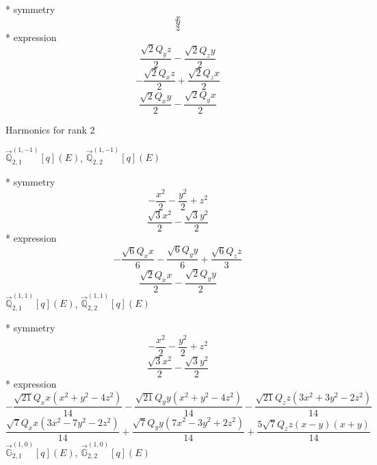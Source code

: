 \documentclass[fleqn,8pt]{jsarticle}
\begin{document}
\noindent\quad ** symmetry
\begin{dmath*}
x
\end{dmath*}
\begin{dmath*}
y
\end{dmath*}
\begin{dmath*}
z
\end{dmath*}
\noindent\quad ** expression
\begin{dmath*}
\frac{\sqrt{2} Q_{y} z}{2} - \frac{\sqrt{2} Q_{z} y}{2}
\end{dmath*}
\begin{dmath*}
- \frac{\sqrt{2} Q_{x} z}{2} + \frac{\sqrt{2} Q_{z} x}{2}
\end{dmath*}
\begin{dmath*}
\frac{\sqrt{2} Q_{x} y}{2} - \frac{\sqrt{2} Q_{y} x}{2}
\end{dmath*}

\noindent * Harmonics for rank 2

\noindent\quad $\vec{\mathbb{Q}}_{2,1}^{(1,-1)}[q](E)$, $\vec{\mathbb{Q}}_{2,2}^{(1,-1)}[q](E)$

\noindent\quad ** symmetry
\begin{dmath*}
- \frac{x^{2}}{2} - \frac{y^{2}}{2} + z^{2}
\end{dmath*}
\begin{dmath*}
\frac{\sqrt{3} x^{2}}{2} - \frac{\sqrt{3} y^{2}}{2}
\end{dmath*}
\noindent\quad ** expression
\begin{dmath*}
- \frac{\sqrt{6} Q_{x} x}{6} - \frac{\sqrt{6} Q_{y} y}{6} + \frac{\sqrt{6} Q_{z} z}{3}
\end{dmath*}
\begin{dmath*}
\frac{\sqrt{2} Q_{x} x}{2} - \frac{\sqrt{2} Q_{y} y}{2}
\end{dmath*}
\noindent\quad $\vec{\mathbb{Q}}_{2,1}^{(1,1)}[q](E)$, $\vec{\mathbb{Q}}_{2,2}^{(1,1)}[q](E)$

\noindent\quad ** symmetry
\begin{dmath*}
- \frac{x^{2}}{2} - \frac{y^{2}}{2} + z^{2}
\end{dmath*}
\begin{dmath*}
\frac{\sqrt{3} x^{2}}{2} - \frac{\sqrt{3} y^{2}}{2}
\end{dmath*}
\noindent\quad ** expression
\begin{dmath*}
- \frac{\sqrt{21} Q_{x} x \left(x^{2} + y^{2} - 4 z^{2}\right)}{14} - \frac{\sqrt{21} Q_{y} y \left(x^{2} + y^{2} - 4 z^{2}\right)}{14} - \frac{\sqrt{21} Q_{z} z \left(3 x^{2} + 3 y^{2} - 2 z^{2}\right)}{14}
\end{dmath*}
\begin{dmath*}
\frac{\sqrt{7} Q_{x} x \left(3 x^{2} - 7 y^{2} - 2 z^{2}\right)}{14} + \frac{\sqrt{7} Q_{y} y \left(7 x^{2} - 3 y^{2} + 2 z^{2}\right)}{14} + \frac{5 \sqrt{7} Q_{z} z \left(x - y\right) \left(x + y\right)}{14}
\end{dmath*}
\noindent\quad $\vec{\mathbb{G}}_{2,1}^{(1,0)}[q](E)$, $\vec{\mathbb{G}}_{2,2}^{(1,0)}[q](E)$
\end{document}
